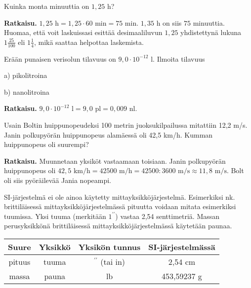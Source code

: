 

\begin{esimerkki}
Kuinka monta minuuttia on $1,25$ h?

\textbf{Ratkaisu. }
$1,25 \text{ h} = 1,25 \cdot 60 \text{ min} = 75 \text{ min}$. $1,35$ h on siis $75$ minuuttia. Huomaa, että voit laskuissasi esittää desimaaliluvun $1,25$ yhdistettynä lukuna $1 \frac{25}{100}$ eli $1 \frac{1}{4}$, mikä saattaa helpottaa laskemista.
\end{esimerkki}

\begin{esimerkki}
Erään punaisen verisolun tilavuus on $9,0 \cdot 10^{-12} \textrm{ l}$. Ilmoita tilavuus

a) pikolitroina

b) nanolitroina

\textbf{Ratkaisu. }
$9,0 \cdot 10^{-12} \textrm{ l} = 9,0 \textrm{ pl} = 0,009 \textrm{ nl}$.

\end{esimerkki}

\begin{esimerkki}
Usain Boltin huippunopeudeksi 100 metrin juoksukilpailussa mitattiin 12,2 m/s.
Janin polkupyörän huippunopeus alamäessä oli 42,5 km/h.
Kumman huippunopeus oli suurempi?

\textbf{Ratkaisu. }
Muunnetaan yksiköt vastaamaan toisiaan.
Janin polkupyörän huippunopeus oli $42,5 \textrm{ km/h} = 42500 \textrm{ m/h} = 42500 : 3600 \textrm{ m/s} \approx 11,8 \textrm{ m/s}$.
Bolt oli siis pyöräilevää Jania nopeampi.
\end{esimerkki}

SI-järjestelmä ei ole ainoa käytetty mittayksikköjärjestelmä. Esimerkiksi nk. brittiläisessä mittayksikköjärjestelmässä pituutta voidaan mitata esimerkiksi tuumissa.
Yksi tuuma (merkitään $1^{\prime \prime}$) vastaa 2,54 senttimetriä. Massan perusyksikkönä brittiläisessä mittayksikköjärjestelmässä käytetään paunaa.

\begin{tabular}{c|c|c|c}
Suure & Yksikkö & Yksikön tunnus & SI-järjestelmässä\\
\hline
pituus & tuuma & $^{\prime \prime}$ (tai in) & 2,54 cm \\
massa & pauna & lb & 453,59237 g \\
\end{tabular}

